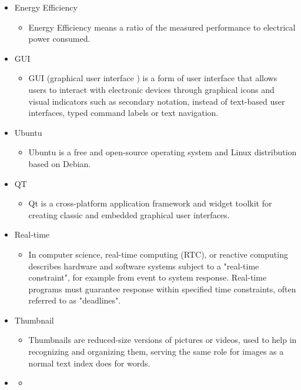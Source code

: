 \documentclass[parskip=full]{scrartcl}
\begin{document}
\begin{itemize}
	
	\item Energy Efficiency
	\begin{itemize}
		\item Energy Efficiency means a ratio of the measured performance to electrical power consumed.
	\end{itemize}
	
	
	\item GUI
	\begin{itemize}
		\item GUI (graphical user interface ) is a form of user interface that allows users to interact with electronic devices through graphical icons and visual indicators such as secondary notation, instead of text-based user interfaces, typed command labels or text navigation.
	\end{itemize}
	
	
	\item Ubuntu
	\begin{itemize}
		\item Ubuntu is a free and open-source operating system and Linux distribution based on Debian.
	\end{itemize}
	
	
	\item QT
	\begin{itemize}
		\item Qt is a cross-platform application framework and widget toolkit for creating classic and embedded graphical user interfaces.
	\end{itemize}
	
	
	\item Real-time
	\begin{itemize}
		\item In computer science, real-time computing (RTC), or reactive computing describes hardware and software systems subject to a "real-time constraint", for example from event to system response. Real-time programs must guarantee response within specified time constraints, often referred to as "deadlines".
	\end{itemize}
	
	
	\item Thumbnail
	\begin{itemize}
		\item Thumbnails are reduced-size versions of pictures or videos, used to help in recognizing and organizing them, serving the same role for images as a normal text index does for words.
	\end{itemize}
	\item 
	\begin{itemize}
		\item
	\end{itemize}
\end{itemize}
\end{document}
